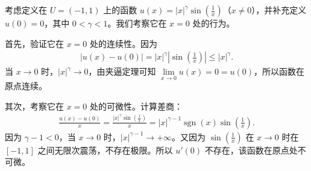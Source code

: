 \documentclass[../../main.tex]{subfiles}
\begin{document}
\begin{examples}
考虑定义在 $U = (-1, 1)$ 上的函数 $u(x) = |x|^{\gamma} \sin \left( \frac{1}{x} \right) $（$x \neq 0$），并补充定义 $u(0) = 0$，其中 $0 < \gamma < 1$。我们考察它在 $x = 0$ 处的行为。

首先，验证它在 $x = 0$ 处的连续性。因为
\begin{align*}
|u(x) - u(0)| = |x|^{\gamma} \left| \sin\left(\frac{1}{x}\right) \right| \leqslant |x|^{\gamma}.
\end{align*}
当 $x \to 0$ 时，$|x|^{\gamma} \to 0$，由夹逼定理可知 $\lim\limits_{x \to 0} u(x) = 0 = u(0)$，所以函数在原点连续。

其次，考察它在 $x = 0$ 处的可微性。计算差商：
\begin{align*}
\frac{u(x) - u(0)}{x} = \frac{|x|^{\gamma} \sin \left( \frac{1}{x} \right) }{x} = |x|^{\gamma - 1} \operatorname{sgn}(x) \sin\left(\frac{1}{x}\right).
\end{align*}
因为 $\gamma - 1 < 0$，当 $x \to 0$ 时，$|x|^{\gamma - 1} \to +\infty$。又因为 $\sin \left( \frac{1}{x} \right) $ 在 $x \to 0$ 时在 $[-1, 1]$ 之间无限次震荡，不存在极限。所以 $u'(0)$ 不存在，该函数在原点处不可微。


\end{examples}
\end{document}
